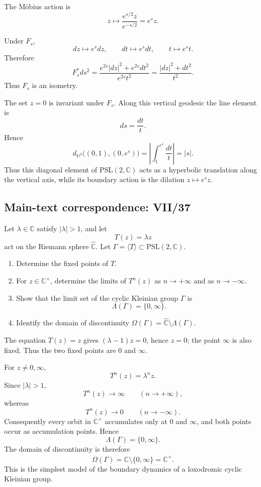\begin{solution}
The M\"{o}bius action is
\[
z\longmapsto
\frac{e^{s/2}z}{e^{-s/2}}
=e^s z.
\]

Under \(F_s\),
\[
dz\longmapsto e^s dz,
\qquad
dt\longmapsto e^s dt,
\qquad
t\longmapsto e^s t.
\]
Therefore
\[
F_s^*ds^2
=
\frac{e^{2s}|dz|^2+e^{2s}dt^2}{e^{2s}t^2}
=
\frac{|dz|^2+dt^2}{t^2}.
\]
Thus \(F_s\) is an isometry.

The set \(z=0\) is invariant under \(F_s\).  Along this vertical
geodesic the line element is
\[
ds=\frac{dt}{t}.
\]
Hence
\[
d_{\mathbb H^3}\bigl((0,1),(0,e^s)\bigr)
=
\left|\int_1^{e^s}\frac{dt}{t}\right|
=
|s|.
\]
Thus this diagonal element of \(\mathrm{PSL}(2,\mathbb C)\) acts as a
hyperbolic translation along the vertical axis, while its boundary
action is the dilation \(z\mapsto e^s z\).
\end{solution}

\subsection*{Main-text correspondence: VII/37}

\begin{problem}
\label{prob:cp-vii-0091}
Let \(\lambda\in\mathbb{C}\) satisfy \(|\lambda|>1\), and let
\[
T(z)=\lambda z
\]
act on the Riemann sphere \(\widehat{\mathbb{C}}\).  Let
\(\Gamma=\langle T\rangle\subset\mathrm{PSL}(2,\mathbb{C})\).

\begin{enumerate}
\item Determine the fixed points of \(T\).
\item For \(z\in\mathbb{C}^{\times}\), determine the limits of
      \(T^n(z)\) as \(n\to+\infty\) and as \(n\to-\infty\).
\item Show that the limit set of the cyclic Kleinian group \(\Gamma\) is
      \[
      \Lambda(\Gamma)=\{0,\infty\}.
      \]
\item Identify the domain of discontinuity
      \(\Omega(\Gamma)=\widehat{\mathbb{C}}\setminus\Lambda(\Gamma)\).
\end{enumerate}
\end{problem}

\begin{solution}
The equation \(T(z)=z\) gives \((\lambda-1)z=0\), hence \(z=0\);
the point \(\infty\) is also fixed.  Thus the two fixed points are
\(0\) and \(\infty\).

For \(z\ne0,\infty\),
\[
T^n(z)=\lambda^n z.
\]
Since \(|\lambda|>1\),
\[
T^n(z)\longrightarrow\infty\qquad(n\to+\infty),
\]
whereas
\[
T^n(z)\longrightarrow0\qquad(n\to-\infty).
\]
Consequently every orbit in \(\mathbb C^\times\) accumulates only at
\(0\) and \(\infty\), and both points occur as accumulation points.
Hence
\[
\boxed{\Lambda(\Gamma)=\{0,\infty\}}.
\]
The domain of discontinuity is therefore
\[
\boxed{\Omega(\Gamma)=\widehat{\mathbb C}\setminus\{0,\infty\}
      =\mathbb C^\times}.
\]
This is the simplest model of the boundary dynamics of a loxodromic
cyclic Kleinian group.
\end{solution}

